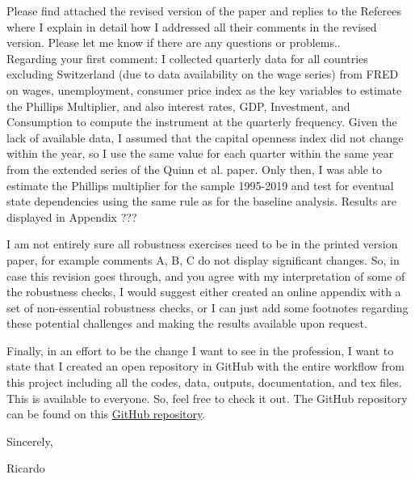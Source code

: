 \documentclass[12pt]{article}
\begin{document}
\noindent  Please find attached the revised version of the paper and replies to the Referees where I explain in detail how I addressed all their comments in the revised version. Please let me know if there are any questions or problems..\\


Regarding your first comment: I collected quarterly data for all countries excluding Switzerland (due to data availability on the wage series) from FRED on wages, unemployment, consumer price index as the key variables to estimate the Phillips Multiplier, and also interest rates, GDP, Investment, and Consumption to compute the instrument at the quarterly frequency. Given the lack of available data, I assumed that the capital openness index did not change within the year, so I use the same value for each quarter within the same year from the extended series of the Quinn et al. paper. Only then, I was able to estimate the Phillips multiplier for the sample 1995-2019 and test for eventual state dependencies using the same rule as for the baseline analysis. Results are displayed in Appendix ???

I am not entirely sure all robustness exercises need to be in the printed version paper, for example comments A, B, C do not display significant changes. So, in case this revision goes through, and you agree with my interpretation of some of the robustness checks, I would suggest either created an online appendix with a set of non-essential robustness checks, or I can just add some footnotes regarding these potential challenges and making the results available upon request.

Finally, in an effort to be the change I want to see in the profession, I want to state that I created an open repository in GitHub with the entire workflow from this project including all the codes, data, outputs, documentation, and tex files. This is available to everyone. So, feel free to check it out. The GitHub repository can be found on this \href{https://github.com/RicardoGabriel/Monetary-Policy-and-the-Wage-Inflation-Unemployment-Tradeoff}{GitHub repository}.


\noindent Sincerely,\smallskip

\noindent Ricardo

\bigskip

\bigskip


\singlespace


\end{document}
